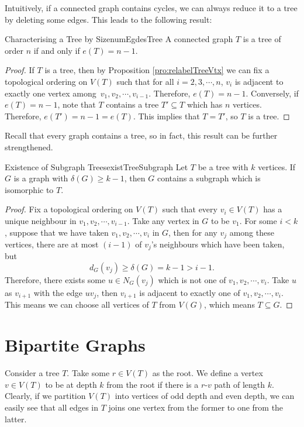\documentclass[math]{amznotes}
\theoremstyle{remark}
\newcommand{\0}{\mathbf{0}}
\newcommand{\1}{\mathbf{1}}
\begin{document}
Intuitively, if a connected graph contains cycles, we can always reduce it to a tree by deleting some edges. This leads to the following result:
\begin{corbox}{Characterising a Tree by Size}{numEgdesTree}
    A connected graph $T$ is a tree of order $n$ if and only if $e(T) = n - 1$.
    \tcblower
    \begin{proof}
        If $T$ is a tree, then by Proposition \ref{pro:relabelTreeVtx} we can fix a topological ordering on $V(T)$ such that for all $i = 2, 3, \cdots, n$, $v_i$ is adjacent to exactly one vertex among~$v_1, v_2, \cdots, v_{i - 1}$. Therefore, $e(T) = n - 1$. Conversely, if $e(T) = n - 1$, note that $T$ contains a tree $T' \subseteq T$ which has $n$ vertices. Therefore, $e(T') = n - 1 = e(T)$. This implies that $T = T'$, so $T$ is a tree.
    \end{proof}
\end{corbox}
Recall that every graph contains a tree, so in fact, this result can be further strengthened.
\begin{probox}{Existence of Subgraph Trees}{existTreeSubgraph}
    Let $T$ be a tree with $k$ vertices. If $G$ is a graph with $\delta(G) \geq k - 1$, then $G$ contains a subgraph which is isomorphic to $T$.
    \tcblower
    \begin{proof}
        Fix a topological ordering on $V(T)$ such that every $v_i \in V\left(T\right)$ has a unique neighbour in $v_1, v_2, \cdots, v_{i - 1}$. Take any vertex in $G$ to be $v_1$. For some $i < k$, suppose that we have taken $v_1, v_2, \cdots, v_i$ in $G$, then for any $v_j$ among these vertices, there are at most $(i - 1)$ of $v_j$'s neighbours which have been taken, but
        \begin{equation*}
            d_G(v_j) \geq \delta(G) = k - 1 > i - 1.
        \end{equation*}
        Therefore, there exists some $u \in N_G(v_j)$ which is not one of $v_1, v_2, \cdots, v_i$. Take $u$ as $v_{i + 1}$ with the edge $uv_j$, then $v_{i + 1}$ is adjacent to exactly one of $v_1, v_2, \cdots, v_i$. This means we can choose all vertices of $T$ from $V(G)$, which means $T \subseteq G$.
    \end{proof}
\end{probox}

\section{Bipartite Graphs}
Consider a tree $T$. Take some $r \in V(T)$ as the root. We define a vertex $v \in V(T)$ to be at depth $k$ from the root if there is a $r$-$v$ path of length $k$. Clearly, if we partition $V(T)$ into vertices of odd depth and even depth, we can easily see that all edges in $T$ joins one vertex from the former to one from the latter.
\end{document}
